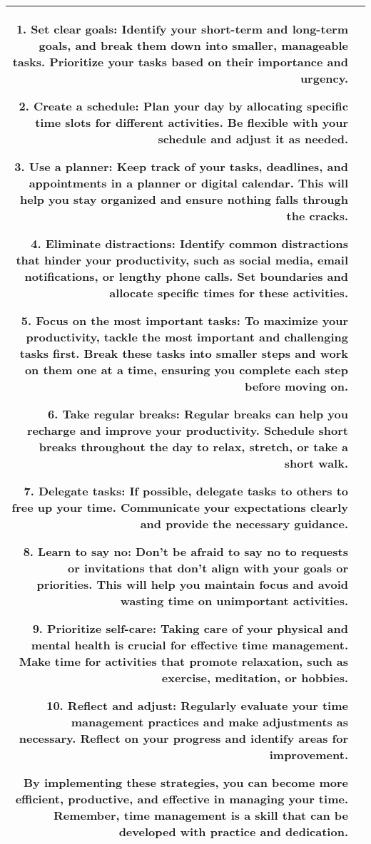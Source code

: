 \documentclass{article}
\begin{document}
{{\begin{tabularx}{\linewidth}{r X}
1. Set clear goals: Identify your short-term and long-term goals, and break them down into smaller, manageable tasks. Prioritize your tasks based on their importance and urgency.

2. Create a schedule: Plan your day by allocating specific time slots for different activities. Be flexible with your schedule and adjust it as needed.

3. Use a planner: Keep track of your tasks, deadlines, and appointments in a planner or digital calendar. This will help you stay organized and ensure nothing falls through the cracks.

4. Eliminate distractions: Identify common distractions that hinder your productivity, such as social media, email notifications, or lengthy phone calls. Set boundaries and allocate specific times for these activities.

5. Focus on the most important tasks: To maximize your productivity, tackle the most important and challenging tasks first. Break these tasks into smaller steps and work on them one at a time, ensuring you complete each step before moving on.

6. Take regular breaks: Regular breaks can help you recharge and improve your productivity. Schedule short breaks throughout the day to relax, stretch, or take a short walk.

7. Delegate tasks: If possible, delegate tasks to others to free up your time. Communicate your expectations clearly and provide the necessary guidance.

8. Learn to say no: Don't be afraid to say no to requests or invitations that don't align with your goals or priorities. This will help you maintain focus and avoid wasting time on unimportant activities.

9. Prioritize self-care: Taking care of your physical and mental health is crucial for effective time management. Make time for activities that promote relaxation, such as exercise, meditation, or hobbies.

10. Reflect and adjust: Regularly evaluate your time management practices and make adjustments as necessary. Reflect on your progress and identify areas for improvement.

By implementing these strategies, you can become more efficient, productive, and effective in managing your time. Remember, time management is a skill that can be developed with practice and dedication.
 \\
 \bottomrule
 \end{tabularx} }

}
\end{document}
